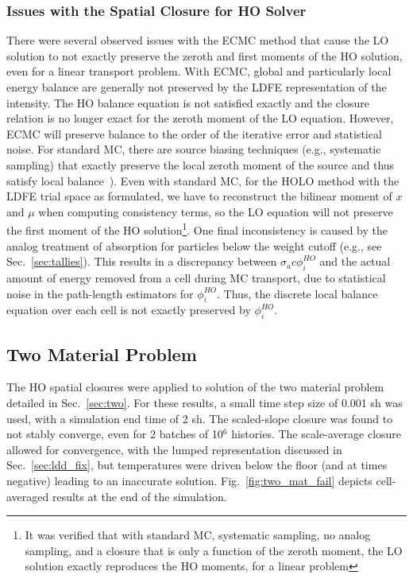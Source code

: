 \subsubsection{Issues with the Spatial Closure for HO Solver}
\label{sec:ecmc_issues}
There were several observed issues with the ECMC method that cause the LO solution to not exactly preserve
the zeroth and first moments of the HO solution, even for a linear transport problem.  With ECMC, global and particularly local
energy balance are generally not preserved by the LDFE representation of the intensity. 
The HO balance equation is not satisfied exactly and the closure relation is no
longer exact for the zeroth moment of the LO equation.
However, ECMC will preserve balance to the order of
the iterative error and statistical noise.  
For standard MC, there
are source biasing techniques (e.g., systematic
sampling) that exactly preserve the local zeroth moment of the
source and thus satisfy local balance~\cite{shultis_mc,wollaber_review}).
Even with standard MC, for the HOLO method with the LDFE trial space as formulated, we have to reconstruct the bilinear moment
of $x$ and $\mu$ when computing consistency terms, so the LO equation will not
preserve the first moment of the HO solution\footnote{It was verified that with
standard MC, systematic sampling, no analog sampling, and a closure that is only a
function of the zeroth moment, the LO solution exactly reproduces the HO moments, for
a linear problem}.  One final inconsistency is caused by the analog treatment of absorption for
particles below the weight cutoff (e.g., see Sec.~\ref{sec:tallies}).  This results in a
discrepancy between $\sigma_a c \phi^{HO}_i$ and the actual amount of energy removed from a cell during MC
transport, due to statistical noise in the path-length
estimators for $\phi^{HO}_i$.   Thus, the discrete local balance equation over each cell is not exactly
preserved by $\phi^{HO}_i$.


\subsection{Two Material Problem}

The HO spatial closures were applied to solution of the two material problem detailed in Sec.~\ref{sec:two}.
For these results, a small time step size of 0.001 sh was used, with a simulation end time
of 2 sh.  The scaled-slope closure was found to not stably converge, even for 2 batches of 10$^6$
histories.  The scale-average closure allowed for convergence, with the lumped
representation discussed in Sec.~\ref{sec:ldd_fix},
but temperatures were driven
below the floor (and at times negative) leading to an inaccurate solution. Fig.~\ref{fig:two_mat_fail} depicts cell-averaged results at the end of the simulation.

